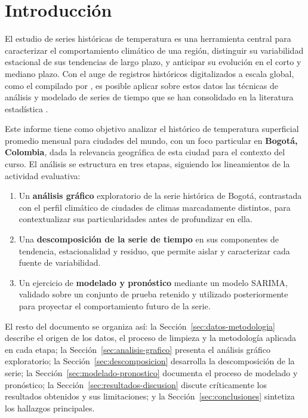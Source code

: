 \section{Introducción}
\label{sec:introduccion}

El estudio de series históricas de temperatura es una herramienta central para caracterizar
el comportamiento climático de una región, distinguir su variabilidad estacional de sus
tendencias de largo plazo, y anticipar su evolución en el corto y mediano plazo. Con el
auge de registros históricos digitalizados a escala global, como el compilado por
\citet{berkeleyearth}, es posible aplicar sobre estos datos las técnicas de análisis y
modelado de series de tiempo que se han consolidado en la literatura estadística
\citep{boxjenkins2015, hyndman2021forecasting}.

Este informe tiene como objetivo analizar el histórico de temperatura superficial promedio
mensual para \DatasetCityCount{} ciudades del mundo, con un foco particular en \textbf{Bogotá,
Colombia}, dada la relevancia geográfica de esta ciudad para el contexto del curso. El
análisis se estructura en tres etapas, siguiendo los lineamientos de la actividad evaluativa:

\begin{enumerate}
  \item Un \textbf{análisis gráfico} exploratorio de la serie histórica de Bogotá,
        contrastada con el perfil climático de ciudades de climas marcadamente distintos, para
        contextualizar sus particularidades antes de profundizar en ella.
  \item Una \textbf{descomposición de la serie de tiempo} en sus componentes de tendencia,
        estacionalidad y residuo, que permite aislar y caracterizar cada fuente de
        variabilidad.
  \item Un ejercicio de \textbf{modelado y pronóstico} mediante un modelo SARIMA, validado
        sobre un conjunto de prueba retenido y utilizado posteriormente para proyectar el
        comportamiento futuro de la serie.
\end{enumerate}

El resto del documento se organiza así: la Sección~\ref{sec:datos-metodologia} describe el
origen de los datos, el proceso de limpieza y la metodología aplicada en cada etapa; la
Sección~\ref{sec:analisis-grafico} presenta el análisis gráfico exploratorio; la
Sección~\ref{sec:descomposicion} desarrolla la descomposición de la serie; la
Sección~\ref{sec:modelado-pronostico} documenta el proceso de modelado y pronóstico; la
Sección~\ref{sec:resultados-discusion} discute críticamente los resultados obtenidos y sus
limitaciones; y la Sección~\ref{sec:conclusiones} sintetiza los hallazgos principales.
